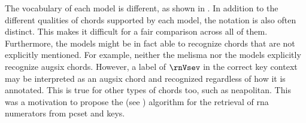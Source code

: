 
The vocabulary of each model is different, as shown in
. In addition to the different
qualities of chords supported by each model, the notation is
also often distinct. This makes it difficult for a fair
comparison across all of them. Furthermore, the models might
be in fact able to recognize chords that are not explicitly
mentioned. For example, neither the \gls{melisma} nor the
\textcite{mcleod2021modular} models explicitly recognize
\gls{augsix} chords. However, a label of $\rnVsev$ in the
correct key context may be interpreted as an \gls{augsix}
chord and recognized regardless of how it is annotated. This
is true for other types of chords too, such as
\gls{neapolitan}. This was a motivation to propose the
\algorithmrn{} (see ) algorithm for the
retrieval of \gls{rna} numerators from \gls{pcset} and keys. 

